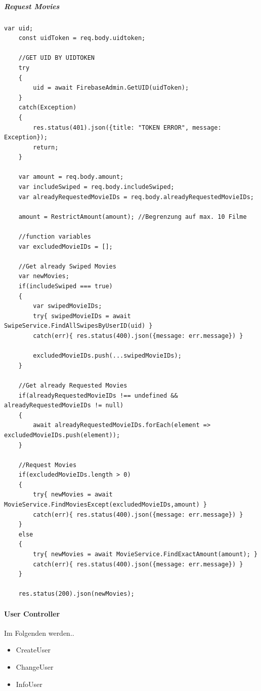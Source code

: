 \subparagraph{Request Movies}
\begin{lstlisting}[caption=TODO, label=lst:TODO]
    var uid; 
    const uidToken = req.body.uidtoken;
    
    //GET UID BY UIDTOKEN
    try
    {
        uid = await FirebaseAdmin.GetUID(uidToken);
    }
    catch(Exception)
    {
        res.status(401).json({title: "TOKEN ERROR", message: Exception});
        return;
    }

    var amount = req.body.amount;
    var includeSwiped = req.body.includeSwiped;
    var alreadyRequestedMovieIDs = req.body.alreadyRequestedMovieIDs;

    amount = RestrictAmount(amount); //Begrenzung auf max. 10 Filme

    //function variables
    var excludedMovieIDs = [];

    //Get already Swiped Movies
    var newMovies;
    if(includeSwiped === true)
    {
        var swipedMovieIDs;
        try{ swipedMovieIDs = await SwipeService.FindAllSwipesByUserID(uid) }
        catch(err){ res.status(400).json({message: err.message}) }

        excludedMovieIDs.push(...swipedMovieIDs);
    }

    //Get already Requested Movies
    if(alreadyRequestedMovieIDs !== undefined && alreadyRequestedMovieIDs != null)
    {
        await alreadyRequestedMovieIDs.forEach(element => excludedMovieIDs.push(element));
    }

    //Request Movies
    if(excludedMovieIDs.length > 0)
    {
        try{ newMovies = await MovieService.FindMoviesExcept(excludedMovieIDs,amount) } 
        catch(err){ res.status(400).json({message: err.message}) }
    }
    else
    {
        try{ newMovies = await MovieService.FindExactAmount(amount); } 
        catch(err){ res.status(400).json({message: err.message}) }
    }

    res.status(200).json(newMovies);
\end{lstlisting}


\paragraph{User Controller}
Im Folgenden werden..
\begin{itemize}
	\item CreateUser
	\item ChangeUser
	\item InfoUser
\end{itemize} 


